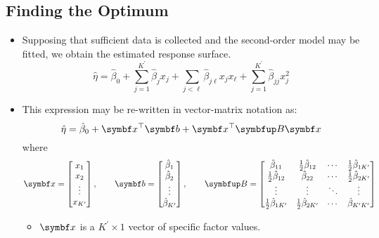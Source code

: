 \subsection*{Finding the Optimum}
\begin{itemize}
    \item Supposing that sufficient data is collected and the second-order model may be fitted, we obtain the
          estimated response surface.
          \[ \hat{\eta}=\hat{\beta}_0+\sum_{j=1}^{K^\prime} \hat{\beta}_j x_j+\sum_{j<\ell}\hat{\beta}_{j\ell}x_j x_\ell +\sum_{j=1}^{K^\prime} \hat{\beta}_{jj}x_j^2  \]
    \item This expression may be re-written in vector-matrix notation as:
          \[ \hat{\eta}=\hat{\beta}_0+\Vector{x}^\top \Vector{b}+\Vector{x}^\top\Matrix{B}\Vector{x} \]
          where
          \[ \Vector{x}=\begin{bmatrix}
                  x_1    \\
                  x_2    \\
                  \vdots \\
                  x_{K^\prime}
              \end{bmatrix},\qquad
              \Vector{b}=\begin{bmatrix}
                  \hat{\beta}_1 \\
                  \hat{\beta}_2 \\
                  \vdots        \\
                  \hat{\beta}_{K^\prime}
              \end{bmatrix},\qquad
              \Matrix{B}=\begin{bmatrix}
                  \hat{\beta}_{11}                   & \frac{1}{2}\hat{\beta}_{12}        & \cdots & \frac{1}{2}\hat{\beta}_{1K^\prime} \\
                  \frac{1}{2}\hat{\beta}_{12}        & \hat{\beta}_{22}                   & \cdots & \frac{1}{2}\hat{\beta}_{2K^\prime} \\
                  \vdots                             & \vdots                             & \ddots & \vdots                             \\
                  \frac{1}{2}\hat{\beta}_{1K^\prime} & \frac{1}{2}\hat{\beta}_{2K^\prime} & \cdots & \hat{\beta}_{K^\prime K^\prime}
              \end{bmatrix} \]
          \begin{itemize}
              \item $ \Vector{x} $ is a $ K^\prime \times 1 $ vector of specific factor values.

\end{itemize}
\end{itemize}
